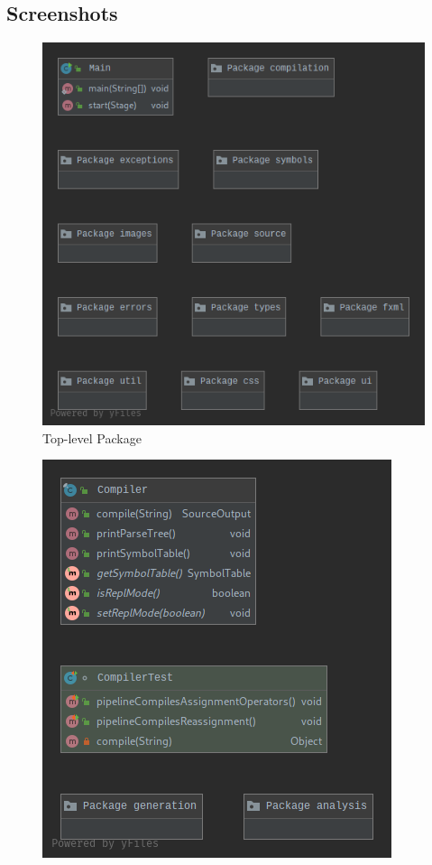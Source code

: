 \documentclass[
]{report}
\begin{document}
\begin{appendices}
	\chapter{Screenshots}
	\begin{figure}
		\centering
		\includegraphics[width=\textwidth]{top-package-diagram}
		\caption{Top-level Package}
		\label{fig:top-package-diagram}
	\end{figure}
	\begin{figure}
		\centering
		\includegraphics[width=\textwidth]{compilation-package-diagram}

\end{figure}
\end{appendices}
\end{document}
